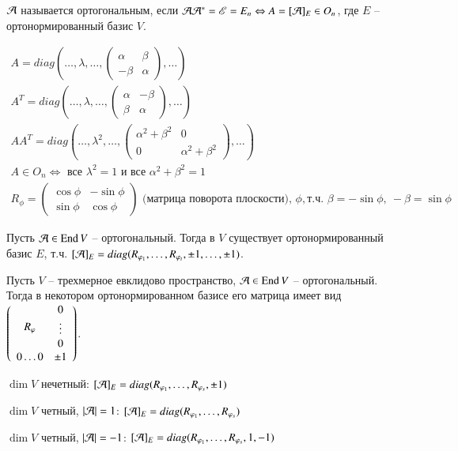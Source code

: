 \documentclass[main]{subfiles}
\begin{document}
$\mathcal{A}$ называется ортогональным, если $\mathcal{A} \mathcal{A}^* = \mathscr{E} = E_n \Leftrightarrow A = [\mathcal{A}]_E \in O_n$, где $E$ -- ортонормированный базис $V$.

\begin{gather*}
    A = diag(\ldots, \lambda, \ldots, \begin{pmatrix} \alpha & \beta \\ -\beta & \alpha \end{pmatrix}, \ldots) \\
    A^T = diag(\ldots, \lambda, \ldots, \begin{pmatrix} \alpha & -\beta \\ \beta & \alpha \end{pmatrix}, \ldots) \\
    AA^T = diag(\ldots, \lambda^2,\ldots, \begin{pmatrix} \alpha^2 + \beta^2 & 0 \\ 0 & \alpha^2 + \beta^2 \end{pmatrix}, \ldots) \\
    A \in O_n \Leftrightarrow \text{ все } \lambda^2 = 1 \text{ и все } \alpha^2 + \beta^2 = 1 \\
    R_{\phi} = \begin{pmatrix}
        \cos \phi & -\sin \phi \\
        \sin \phi & \cos \phi
    \end{pmatrix} \text{ (матрица поворота плоскости), } \phi, \text{т.ч. } \beta = -\sin \phi, \ -\beta = \sin \phi
\end{gather*}

\begin{corollary}
    Пусть $\mathcal{A} \in \operatorname{End} V$ -- ортогональный. Тогда в $V$ существует ортонормированный базис $E$, т.ч.
    $[\mathcal{A}]_E = diag(R_{\varphi_1}, \ldots, R_{\varphi_t}, \pm 1, \ldots, \pm 1)$.
\end{corollary}

\begin{corollary} 
    Пусть $V$ -- трехмерное евклидово пространство, $\mca \in \End V$ -- ортогональный. Тогда в некотором ортонормированном базисе его матрица имеет вид 
    $\left(\begin{array}{c c}
            R_{\phi}       & \begin{matrix}
                0      \\
                \vdots \\
                0      \\
            \end{matrix}   \\
            
            0 \ldots 0 & \pm 1 \\
        \end{array}\right)$.
\end{corollary}

$\dim V$ нечетный: $[\mathcal{A}]_E = diag(R_{\varphi_1}, \ldots, R_{\varphi_s}, \pm 1)$

$\dim V$ четный, $|\mathcal{A}| = 1$: $[\mathcal{A}]_E = diag(R_{\varphi_1}, \ldots, R_{\varphi_s})$

$\dim V$ четный, $|\mathcal{A}| = -1$: $[\mathcal{A}]_E = diag(R_{\varphi_1}, \ldots, R_{\varphi_s}, 1, -1)$
\end{document}
